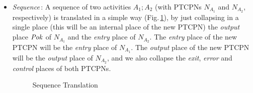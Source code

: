 \begin{itemize}

\item {\it Sequence}\,: A sequence of two activities $A_1;A_2$ (with PTCPNs $N_{A_1}$ and
      $N_{A_2}$, respectively)
      is translated in a simple
      way (Fig.\,\ref{seq}), by just collapsing in a 
      single place (this will be
      an internal place of the new PTCPN)
      the {\it output} place ${\it Pok}$ of $N_{A_1}$ and the
      {\it entry} place of $N_{A_2}$.  The {\it entry} place
      of the new PTCPN will
      be the {\it entry} place of $N_{A_1}$. The
      {\it output} place of the new PTCPN will
      be the {\it output} place of  $N_{A_2}$, and we also
      collapse the {\it exit}, {\it error} and {\it control}  places of both PTCPNs.


\begin{figure}[!ht]
\begin{center}
\end{center}
\caption{\label{seq} Sequence Translation}
\end{figure}


\end{itemize}
